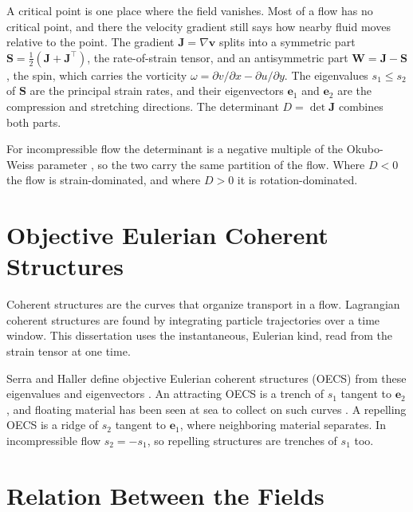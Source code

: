 A critical point is one place where the field vanishes. Most of a flow
has no critical point, and there the velocity gradient still says how
nearby fluid moves relative to the point. The gradient
$\mathbf{J} = \nabla\mathbf{v}$ splits into a symmetric part
$\mathbf{S} = \tfrac{1}{2}(\mathbf{J} + \mathbf{J}^{\top})$, the
rate-of-strain tensor, and an antisymmetric part
$\mathbf{W} = \mathbf{J} - \mathbf{S}$, the spin, which carries the
vorticity $\omega = \partial v/\partial x - \partial u/\partial y$. The
eigenvalues $s_1 \leq s_2$ of $\mathbf{S}$ are the principal strain
rates, and their eigenvectors $\mathbf{e}_1$ and $\mathbf{e}_2$ are the
compression and stretching directions. The determinant
$D = \det\mathbf{J}$ combines both parts.

For incompressible flow the determinant is a negative multiple of the
Okubo-Weiss parameter \cite{4,48}, so the two carry the same partition of
the flow. Where $D < 0$ the flow is strain-dominated, and where $D > 0$
it is rotation-dominated.

\section{Objective Eulerian Coherent Structures}
\label{sec:ch3:oecs}

Coherent structures are the curves that organize transport in a flow.
Lagrangian coherent structures are found by integrating particle
trajectories over a time window. This dissertation uses the
instantaneous, Eulerian kind, read from the strain tensor at one time.

Serra and Haller define objective Eulerian coherent structures (OECS)
from these eigenvalues and eigenvectors \cite{49}. An attracting OECS is a
trench of $s_1$ tangent to $\mathbf{e}_2$, and floating material has been
seen at sea to collect on such curves \cite{50}. A repelling OECS is a
ridge of $s_2$ tangent to $\mathbf{e}_1$, where neighboring material
separates. In incompressible flow $s_2 = -s_1$, so repelling structures are
trenches of $s_1$ too.

\section{Relation Between the Fields}
\label{sec:ch3:relation}

